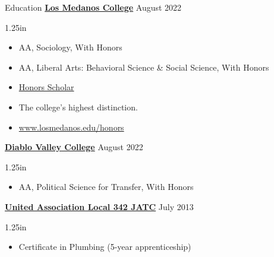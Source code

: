 \documentclass[
	12pt, %
]{resume} %
\newcommand{\righthandindent}{1.25in}
\begin{document}
\begin{rSection}{Education}
    \textbf{\href{https://www.losmedanos.edu/}{Los Medanos College}} \hfill August 2022 
\begin{adjustwidth}{0pt}{\righthandindent}
\vspace{-7pt}
\begin{itemize}
    \item[] AA, Sociology, With Honors
    \vspace{-7pt}
    \item[] AA, Liberal Arts: Behavioral Science \& Social Science, With Honors
    \vspace{-7pt}
    \item[] \href{https://www.losmedanos.edu/honors/prog.aspx\#:~:text=Honors\%20Scholar\%20Requirements}{Honors Scholar}
    \vspace{-7pt}
    \item[] \hspace*{20pt}The college’s highest distinction.
    \vspace{-7pt}
    \item[] \hspace*{20pt}\href{https://www.losmedanos.edu/honors/prog.aspx\#:~:text=Honors\%20Scholar\%20Requirements}{www.losmedanos.edu/honors}
\end{itemize}

\end{adjustwidth}

    \textbf{\href{https://www.dvc.edu/}{Diablo Valley College}} \hfill August 2022
\begin{adjustwidth}{0pt}{\righthandindent}
    \vspace{-7pt}
    \begin{itemize}
        \item[] AA, Political Science for Transfer, With Honors
    \end{itemize}
\end{adjustwidth}

    \href{https://ua342.org/training}{\textbf{United Association Local 342 JATC}} \hfill July 2013
\begin{adjustwidth}{0pt}{\righthandindent}
    \vspace{-7pt}
    \begin{itemize}
        \item[] Certificate in Plumbing (5-year apprenticeship)
    \end{itemize}
\end{adjustwidth}

\end{rSection}
\end{document}
